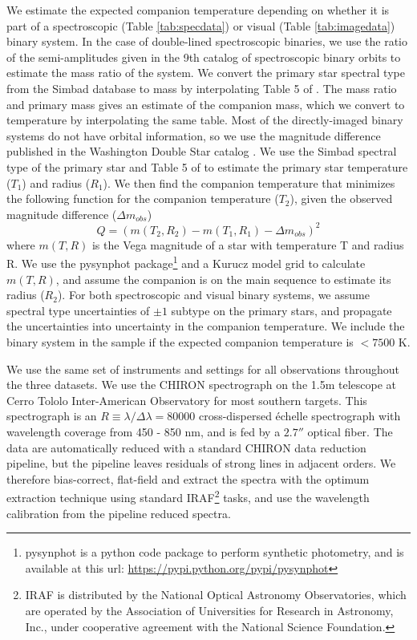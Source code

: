 \documentclass{emulateapj}
\begin{document}
We estimate the expected companion temperature depending on whether it is part of a spectroscopic (Table \ref{tab:specdata}) or visual (Table \ref{tab:imagedata}) binary system. In the case of double-lined spectroscopic binaries, we use the ratio of the semi-amplitudes given in the 9th catalog of spectroscopic binary orbits \citep[SB9,][]{SB9} to estimate the mass ratio of the system. We convert the primary star spectral type from the Simbad database \citep{Simbad} to mass by interpolating Table 5 of \citet{Pecaut2013}. The mass ratio and primary mass gives an estimate of the companion mass, which we convert to temperature by interpolating the same table. Most of the directly-imaged binary systems do not have orbital information, so we use the magnitude difference published in the Washington Double Star catalog \citep[WDS, ][]{WDS}. We use the Simbad spectral type of the primary star and Table 5 of \citet{Pecaut2013} to estimate the primary star temperature ($T_1$) and radius ($R_1$). We then find the companion temperature that minimizes the following function for the companion temperature ($T_2$), given the observed magnitude difference ($\Delta m_{obs}$)
\begin{equation}
Q = (m(T_2, R_2) - m(T_1, R_1) - \Delta m_{obs})^2
\label{eqn:secteff}
\end{equation}
where $m(T, R)$ is the Vega magnitude of a star with temperature T and radius R. We use the pysynphot package\footnote{pysynphot is a python code package to perform synthetic photometry, and is available at this url: \url{https://pypi.python.org/pypi/pysynphot}} and a Kurucz model grid \citep{Castelli2003} to calculate $m(T, R)$, and assume the companion is on the main sequence to estimate its radius ($R_2$). For both spectroscopic and visual binary systems, we assume spectral type uncertainties of $\pm 1$ subtype on the primary stars, and propagate the uncertainties into uncertainty in the companion temperature. We include the binary system in the sample if the expected companion temperature is $< 7500$ K. 

We use the same set of instruments and settings for all observations throughout the three datasets. We use the CHIRON spectrograph \citep{CHIRON} on the 1.5m telescope at Cerro Tololo Inter-American Observatory for most southern targets. This spectrograph is an $R\equiv \lambda / \Delta \lambda = 80000$ cross-dispersed \'echelle spectrograph with wavelength coverage from 450 - 850 nm, and is fed by a $2.7''$ optical fiber. The data are automatically reduced with a standard CHIRON data reduction pipeline, but the pipeline leaves residuals of strong lines in adjacent orders. We therefore bias-correct, flat-field and extract the spectra with the optimum extraction technique \citep{Horne1986} using standard IRAF\footnote{IRAF is distributed by the National Optical Astronomy Observatories, which are operated by the Association of Universities for Research in Astronomy, Inc., under cooperative agreement with the National Science Foundation.} tasks, and use the wavelength calibration from the pipeline reduced spectra.
\end{document}
